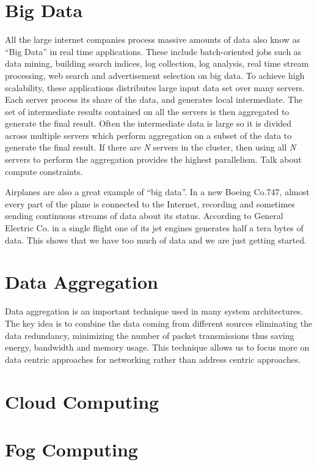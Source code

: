 	\section{Big Data}
		All the large internet companies process massive amounts of data also know as ``Big Data'' in real time applications.
		These include batch-oriented jobs such as data mining, building search indices, log collection, log analysis, real time stream processing, web search and advertisement selection on big data.
		To achieve high scalability, these applications distributes large input data set over many servers.
		Each server process its share of the data, and generates local intermediate.
		The set of intermediate results contained on all the servers is then aggregated to generate the final result.
		Often the intermediate data is large so it is divided across multiple servers which perform aggregation on a subset of the data to generate the final result. 
		If there are \emph{N} servers in the cluster, then using all \emph{N} servers to perform the aggregation provides the highest parallelism. Talk about compute constraints.
		\cite{Goossens:1994}
		
		Airplanes are also a great example of ``big data''. 
		In a new Boeing Co.747, almost every part of the plane is connected to the Internet, recording and sometimes sending continuous streams of data about its status.
		According to General Electric Co. in a single flight one of its jet engines generates half a tera bytes of data.
		This shows that we have too much of data and we are just getting started.

	\section{Data Aggregation}

		Data aggregation is an important technique used in many system architectures. 
		The key idea is to combine the data coming from different sources eliminating the data redundancy, minimizing the number of packet transmissions thus saving energy, bandwidth and memory usage.
		This technique allows us to focus more on data centric approaches for networking rather than address centric approaches.  \cite{krishnamachari2002impact}  

	\section{Cloud Computing}

	\section{Fog Computing}

		\subsubsection{}

